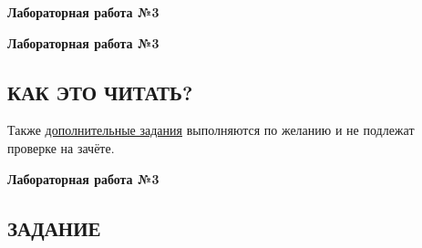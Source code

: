 \documentclass[12pt]{article}
\newcommand{\lablogo}
{
\begin{center}
    \huge{\textbf{Лабораторная работа №3}} \\
\end{center}
}
\newcommand{\colorURL}[1]{\textcolor{CtpBlue}{#1}}
\newcommand{\colorGIT}[1]{\textcolor{CtpGreen}{#1}}
\begin{document}
\pagestyle{empty}

\lablogo

\tableofcontents
\lstlistoflistings

\newpage

\pagestyle{fancy}

\lablogo

\pagestyle{fancy}

\begin{center}
	\section{КАК ЭТО ЧИТАТЬ? \ \texorpdfstring{\faBookOpen}{}}
\end{center}

\lipsum[1-3]

Также \textcolor{CtpLavender}{\hyperref[sect:task]{дополнительные задания}} выполняются по желанию и не подлежат проверке на зачёте.

%
%
%
%
%
%
%
%
%
%

\newpage

\lablogo

\begin{center}
	\section{ЗАДАНИЕ \ \texorpdfstring{\faScroll}{}}
\end{center}

\vspace{4pt}
\end{document}
